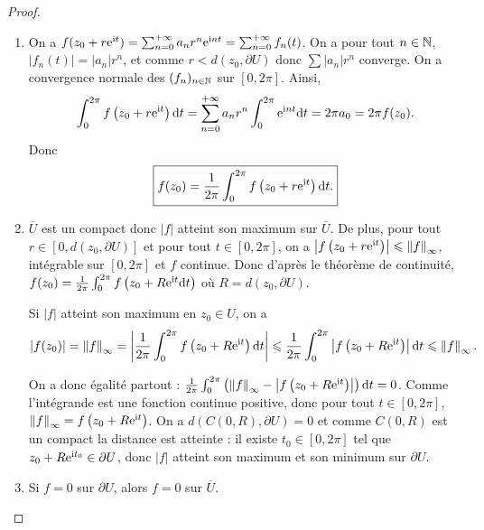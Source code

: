 \documentclass[12pt]{article}
\begin{document}
\begin{proof}
    \phantom{}
    \begin{enumerate}
        \item On a $f(z_{0}+r\mathrm{e}^{\mathrm{i} t})=\sum_{n=0}^{+\infty}a_n r^{n}\mathrm{e}^{\mathrm{i} nt}=\sum_{n=0}^{+\infty}f_n(t)$. On a pour tout $n\in\mathbb{N}$, $\left\lvert f_n(t)\right\rvert=\left\lvert a_n\right\rvert r^{n}$, et comme $r<d(z_{0},\partial U)$ donc $\sum \left\lvert a_n\right\rvert r^{n}$ converge. On a convergence normale des $(f_n)_{n\in\mathbb{N}}$ sur $[0,2\pi]$.
        Ainsi,
        \begin{equation}
            \int_{0}^{2\pi}f\left(z_{0}+r\mathrm{e}^{\mathrm{i} t}\right)\mathrm{d} t=\sum_{n=0}^{+\infty}a_n r^{n}\int_{0}^{2\pi}\mathrm{e}^{\mathrm{i} nt}\mathrm{d} t=2\pi a_0=2\pi f(z_{0}).
        \end{equation}
        Donc 
        \begin{equation}
            \boxed{
                f(z_{0})=\frac{1}{2\pi}\int_{0}^{2\pi}f\left(z_0+r\mathrm{e}^{\mathrm{i} t}\right)\mathrm{d} t.
            }
        \end{equation}

        \item $\overline{U}$ est un compact donc $\left\lvert f\right\rvert$ atteint son maximum sur $\overline{U}$. De plus, pour tout $r\in[0,d(z_{0},\partial U)]$ et pour tout $t\in[0,2\pi]$, on a $\left\lvert f\left(z_{0}+r\mathrm{e}^{\mathrm{i} t}\right)\right\rvert\leqslant\left\lVert f\right\rVert_{\infty}$, intégrable sur $[0,2\pi]$ et $f$ continue. Donc d'après le théorème de continuité, $f(z_{0})=\frac{1}{2\pi}\int_{0}^{2\pi}f\left(z_0+R\mathrm{e}^{\mathrm{i} t}\mathrm{d} t\right)$ où $R=d(z_{0},\partial U)$.
        
        Si $\left\lvert f\right\rvert$ atteint son maximum en $z_{0}\in U$, on a 
        \begin{equation}
            \left\lvert f(z_{0})\right\rvert=\left\lVert f\right\rVert_{\infty}=\left\lvert \frac{1}{2\pi}\int_{0}^{2\pi}f\left(z_{0}+R\mathrm{e}^{\mathrm{i} t}\right)\mathrm{d} t\right\rvert\leqslant\frac{1}{2\pi}\int_{0}^{2\pi}\left\lvert f\left(z_{0}+R\mathrm{e}^{\mathrm{i} t}\right)\right\rvert\mathrm{d} t\leqslant\left\lVert f\right\rVert_{\infty}.
        \end{equation}

        On a donc égalité partout : $\frac{1}{2\pi}\int_{0}^{2\pi}\left(\left\lVert f\right\rVert_{\infty}-\left\lvert f\left(z_0+R\mathrm{e}^{\mathrm{i} t}\right)\right\rvert\right)\mathrm{d} t=0$. Comme l'intégrande est une fonction continue positive, donc pour tout $t\in[0,2\pi]$, $\left\lVert f\right\rVert_{\infty}=f\left(z_{0}+R\mathrm{e}^{\mathrm{i} t}\right)$. On a $d\left(C(0,R),\partial U\right)=0$ et comme $C(0,R)$ est un compact la distance est atteinte : il existe $t_{0}\in[0,2\pi]$ tel que $z_{0}+R\mathrm{e}^{\mathrm{i} t_0}\in\partial U$, donc $\left\lvert f\right\rvert$ atteint son maximum et son minimum sur $\partial U$.

        \item Si $f=0$ sur $\partial U$, alors $f=0$ sur $\overline{U}$.
    \end{enumerate}
\end{proof}
\end{document}
